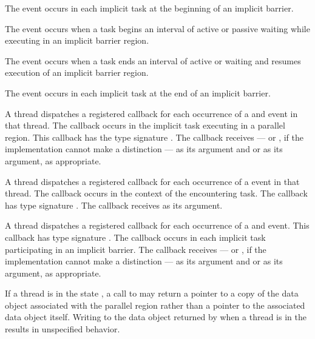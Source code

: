 The  event occurs in each implicit task
at the beginning of an implicit barrier.

The  event occurs when a task begins an interval of
active or passive waiting while executing in an implicit barrier region.

The  event occurs when a task ends an interval of
active or waiting and resumes execution of an implicit barrier region.

The  event occurs in each implicit task
at the end of an implicit barrier.

\tools

A thread dispatches a registered 
callback for each occurrence of a  and
 event in that thread.  The callback occurs
in the implicit task executing in a parallel region.
This callback has the type signature
.  The callback receives
 --- or
, if the implementation cannot make a
distinction --- as its  argument and
 or  as its
 argument, as appropriate.

A thread dispatches a registered 
callback for each occurrence of a  event in that thread.
The callback occurs in the context of the encountering task.  The
callback has type signature .  The
callback receives  as its 
argument.

A thread dispatches a registered
 callback for each occurrence
of a  and
 event.  This callback has type
signature .  The callback occurs
in each implicit task participating in an implicit barrier.  The
callback receives  --- or
, if the implementation cannot make a
distinction --- as its 
argument and  or  as
its  argument, as appropriate.

\restrictions

If a thread is in the state , 
a call to  may return a pointer to a copy of the 
data object associated with the parallel region rather than a pointer to 
the associated data object itself. Writing to the data object 
returned by  when a thread is in the 
 results in unspecified behavior.


